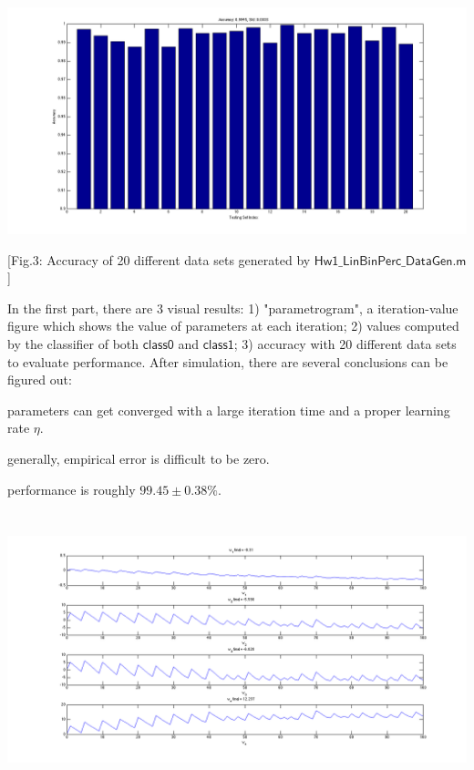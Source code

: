 \documentclass[12pt]{article}
\makeatletter
\renewenvironment{itemize}
{\list{$\bullet$}{\leftmargin\z@ \labelwidth\z@ \itemindent-\leftmargin
\let\makelabel\descriptionlabel}}
{\endlist}
\makeatother
\begin{document}
\vspace*{-2em}
\hspace*{-12.5em}
\includegraphics[scale=.58]{../res/part1_performance.png}
\vspace*{-4em}
\begin{center}
[Fig.3: Accuracy of 20 different data sets generated by $\mathsf{Hw1\_LinBinPerc\_DataGen.m}$]
\end{center}
\newpage
\vspace*{-1.5em}

In the first part, there are 3 visual results: 1) "parametrogram", a iteration-value figure which shows the value of parameters at each iteration; 2) values computed by the classifier of both $\mathsf{class0}$ and $\mathsf{class1}$; 3) accuracy with 20 different data sets to evaluate performance. After simulation, there are several conclusions can be figured out:
\begin{itemize}
	\item parameters can get converged with a large iteration time and a proper learning rate $\eta$.
	\item generally, empirical error is difficult to be zero.
	\item performance is roughly $99.45 \pm 0.38 \%$.
\end{itemize}

\vspace*{-0.8em}
\hspace*{-13em}
\includegraphics[width=26.5cm,height=8cm]{../res/part2_parametrogram1_init0.png}
\end{document}
